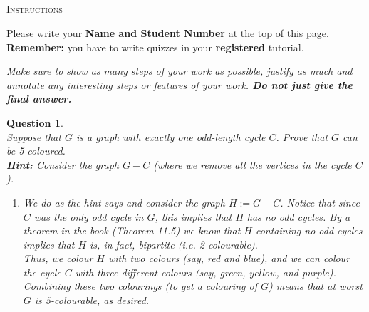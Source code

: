 \documentclass[twoside]{article}
\theoremstyle{mystyle}
\newtheorem{quest}{Question}
\begin{document}
\begin{center}
\section*{}
\vspace{0.1in}
\large \underline{\textsc{Instructions}}
\vspace{0.1in}
\normalsize

Please write your \textbf{Name and Student Number} at the top of this page.\\

\textbf{Remember:} you have to write quizzes in your \textbf{registered} tutorial.
\vspace{0.1in}
\end{center}


\begin{center}
\textit{Make sure to show as many steps of your work as possible, justify as much and annotate any interesting steps or features of your work.  \textbf{Do not just give the final answer.}} \\
\end{center}



\begin{quest}\mbox{}\\

\noindent Suppose that $G$ is a graph with \textit{exactly} one odd-length cycle $C$.  Prove that $G$ can be 5-coloured.\\

\noindent \textbf{Hint:} Consider the graph $G-C$ (where we remove all the vertices in the cycle $C$).


\begin{enumerate}

\item[{\bfseries Solution:}] We do as the hint says and consider the graph $H := G - C$. Notice that since $C$ was the \emph{only} odd cycle in $G$, this implies that $H$ has no odd cycles. By a theorem in the book (Theorem 11.5) we know that $H$ containing no odd cycles implies that $H$ is, in fact, bipartite (i.e. 2-colourable). \\

Thus, we colour $H$ with two colours (say, red and blue), and we can colour the cycle $C$ with three different colours (say, green, yellow, and purple). Combining these two colourings (to get a colouring of $G$) means that \emph{at worst} $G$ is 5-colourable, as desired.

\end{enumerate}


\end{quest}
     
\end{document}
